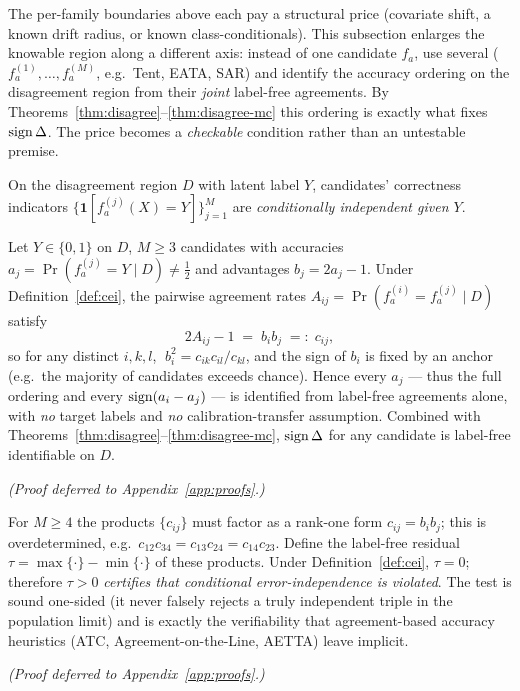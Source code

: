 
The per-family boundaries above each pay a structural price (covariate shift, a known
drift radius, or known class-conditionals). This subsection enlarges the knowable region
along a different axis: instead of one candidate $f_a$, use several
($f_a^{(1)},\dots,f_a^{(M)}$, e.g.\ Tent, EATA, SAR) and identify the accuracy ordering on
the disagreement region from their \emph{joint} label-free agreements. By
Theorems~\ref{thm:disagree}--\ref{thm:disagree-mc} this ordering is exactly what fixes
$\operatorname{sign}\Delta$. The price becomes a \emph{checkable} condition rather than an untestable
premise.

\begin{definition}\label{def:cei}
On the disagreement region $D$ with latent label $Y$, candidates' correctness indicators
$\{\mathbf1[f_a^{(j)}(X){=}Y]\}_{j=1}^M$ are \emph{conditionally independent given $Y$}.
\end{definition}

\begin{theorem}\label{thm:multicand}
Let $Y\in\{0,1\}$ on $D$, $M\ge3$ candidates with accuracies $a_j=\Pr(f_a^{(j)}{=}Y\mid D)\neq\tfrac12$
and advantages $b_j=2a_j-1$. Under Definition~\ref{def:cei}, the pairwise agreement rates
$A_{ij}=\Pr(f_a^{(i)}{=}f_a^{(j)}\mid D)$ satisfy
\[
2A_{ij}-1 \;=\; b_i b_j \;=:\; c_{ij},
\]
so for any distinct $i,k,l$, $\;b_i^2=c_{ik}c_{il}/c_{kl}$, and the sign of $b_i$ is fixed
by an anchor (e.g.\ the majority of candidates exceeds chance). Hence every $a_j$ --- thus
the full ordering and every $\operatorname{sign}(a_i-a_j)$ --- is identified from label-free agreements
alone, with \emph{no} target labels and \emph{no} calibration-transfer assumption.
Combined with Theorems~\ref{thm:disagree}--\ref{thm:disagree-mc}, $\operatorname{sign}\Delta$ for any
candidate is label-free identifiable on $D$.
\end{theorem}
\emph{(Proof deferred to Appendix~\ref{app:proofs}.)}

\begin{proposition}\label{prop:cei-test}
For $M\ge4$ the products $\{c_{ij}\}$ must factor as a rank-one form $c_{ij}=b_ib_j$;
this is overdetermined, e.g.\ $c_{12}c_{34}=c_{13}c_{24}=c_{14}c_{23}$. Define the
label-free residual $\tau=\max\{\cdot\}-\min\{\cdot\}$ of these products. Under
Definition~\ref{def:cei}, $\tau=0$; therefore $\tau>0$ \emph{certifies that conditional
error-independence is violated}. The test is sound one-sided (it never falsely rejects a
truly independent triple in the population limit) and is exactly the verifiability that
agreement-based accuracy heuristics (ATC, Agreement-on-the-Line, AETTA) leave implicit.
\end{proposition}
\emph{(Proof deferred to Appendix~\ref{app:proofs}.)}

